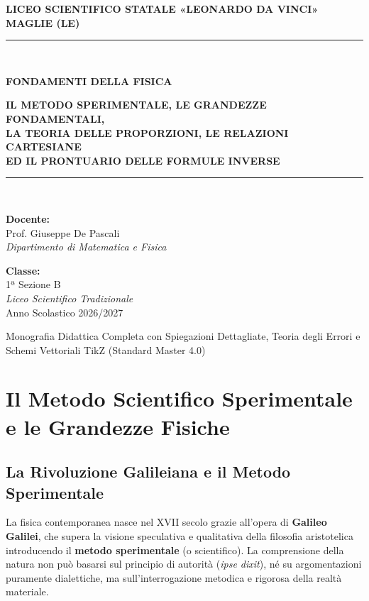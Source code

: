 \documentclass[11pt,a4paper,oneside]{report}
\begin{document}
\begin{titlepage}
\begin{center}
  \vspace*{0.8cm}
  {\Large\textbf{LICEO SCIENTIFICO STATALE «LEONARDO DA VINCI»}}\\[0.25cm]
  {\large\textbf{MAGLIE (LE)}}\\[1.8cm]
  \rule{\textwidth}{1.5pt}\\[0.6cm]
  {\fontsize{24}{32}\selectfont\bfseries\color{primaryBlue} FONDAMENTI DELLA FISICA\par}\vspace{0.5cm}
  {\fontsize{12}{18}\selectfont\bfseries\color{textDark} IL METODO SPERIMENTALE, LE GRANDEZZE FONDAMENTALI,\\[0.15cm] LA TEORIA DELLE PROPORZIONI, LE RELAZIONI CARTESIANE\\[0.15cm] ED IL PRONTUARIO DELLE FORMULE INVERSE\par}\vspace{0.5cm}
  \rule{\textwidth}{1.5pt}\\[2cm]
  
  \begin{minipage}{0.48\textwidth}
    \textbf{Docente:}\\
    Prof. Giuseppe De Pascali\\
    \textit{Dipartimento di Matematica e Fisica}
  \end{minipage}
  \hfill
  \begin{minipage}{0.48\textwidth}
    \raggedleft
    \textbf{Classe:}\\
    1ª Sezione B\\
    \textit{Liceo Scientifico Tradizionale}\\
    Anno Scolastico 2026/2027
  \end{minipage}

  \vfill
  {\small Monografia Didattica Completa con Spiegazioni Dettagliate, Teoria degli Errori e Schemi Vettoriali TikZ (Standard Master 4.0)}
\end{center}
\end{titlepage}

\tableofcontents
\newpage

\chapter{Il Metodo Scientifico Sperimentale e le Grandezze Fisiche}

\section{La Rivoluzione Galileiana e il Metodo Sperimentale}
La fisica contemporanea nasce nel XVII secolo grazie all'opera di \textbf{Galileo Galilei}, che supera la visione speculativa e qualitativa della filosofia aristotelica introducendo il \textbf{metodo sperimentale} (o scientifico). 
La comprensione della natura non può basarsi sul principio di autorità (\textit{ipse dixit}), né su argomentazioni puramente dialettiche, ma sull'interrogazione metodica e rigorosa della realtà materiale.
\end{document}
